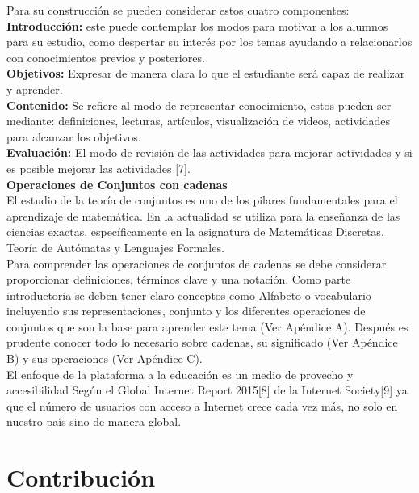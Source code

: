 \documentclass{llncs}
\begin{document}
Para su construcción se pueden considerar estos cuatro componentes:\\
\textbf{Introducción:} este puede contemplar los modos para motivar a los alumnos para su estudio, como despertar su interés por los temas ayudando a relacionarlos con conocimientos previos y posteriores.\\
\textbf{Objetivos:} Expresar de manera clara lo que el estudiante será capaz de realizar y aprender.\\
\textbf{Contenido:} Se refiere al modo de representar conocimiento, estos pueden ser mediante: definiciones, lecturas, artículos, visualización de videos, actividades para alcanzar los objetivos.\\
\textbf{Evaluación:} El modo de revisión de las actividades para mejorar actividades y si es posible mejorar las actividades [7].\\
\textbf{Operaciones de Conjuntos con cadenas}\\
El estudio de la teoría de conjuntos es uno de los pilares fundamentales para el aprendizaje de matemática. En la actualidad se utiliza para la enseñanza de las ciencias exactas, específicamente en la asignatura de Matemáticas Discretas, Teoría de Autómatas y Lenguajes Formales.\\
Para comprender las operaciones de conjuntos de cadenas se debe considerar proporcionar definiciones, términos clave y una notación. Como parte introductoria se deben tener claro conceptos como Alfabeto o vocabulario incluyendo sus representaciones, conjunto y los diferentes operaciones de conjuntos que son la base para aprender este tema (Ver Apéndice A). Después es prudente conocer todo lo necesario sobre cadenas, su significado (Ver Apéndice B) y sus operaciones (Ver Apéndice C).\\
El enfoque de la plataforma a la educación es un medio de provecho y accesibilidad Según el Global Internet Report 2015[8] de la Internet Society[9] ya que el número de usuarios con acceso a Internet crece cada vez más, no solo en nuestro país sino de manera global.


%

%
\section{Contribución}
%
\end{document}
